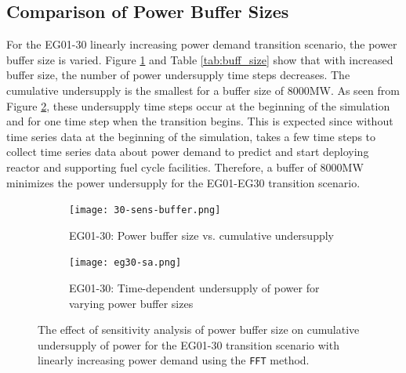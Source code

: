 \subsection{Comparison of Power Buffer Sizes}
For the EG01-30 linearly increasing power demand 
transition scenario, the power buffer size is varied. 
Figure \ref{fig:eg30-bufplot} and Table \ref{tab:buff_size} 
show that with increased buffer size, the number of 
power undersupply time steps decreases. 
The cumulative undersupply is the smallest for a buffer 
size of 8000MW.  
As seen from Figure \ref{fig:eg30-dotplot}, these undersupply time 
steps occur at the beginning of the simulation and for one 
time step when the transition begins. 
This is expected since without time series data 
at the beginning of the simulation, \deploy takes a few 
time steps to collect time series data about power demand 
to predict and start deploying reactor and supporting 
fuel cycle facilities. 
Therefore, a buffer of 8000MW minimizes 
the power undersupply for the EG01-EG30 transition scenario.

\begin{figure}[]
	\centering
	\begin{subfigure}[t]{\textwidth}
		\centering
		\texttt{[image: 30-sens-buffer.png]} 
		\caption{EG01-30: Power buffer size vs. cumulative undersupply}
		\label{fig:eg30-bufplot}
	\end{subfigure}
	\begin{subfigure}[t]{\textwidth}
		\centering
		\texttt{[image: eg30-sa.png]} 
		\caption{EG01-30: Time-dependent undersupply of power for varying power buffer sizes}
		\label{fig:eg30-dotplot}
	\end{subfigure}
	\hfill
    \caption{The effect of sensitivity analysis of power buffer size on cumulative 
    undersupply of power for the EG01-30 transition scenario with linearly 
    increasing power demand using the \texttt{FFT} method.}
	\label{fig:sabuffer}
\end{figure}

